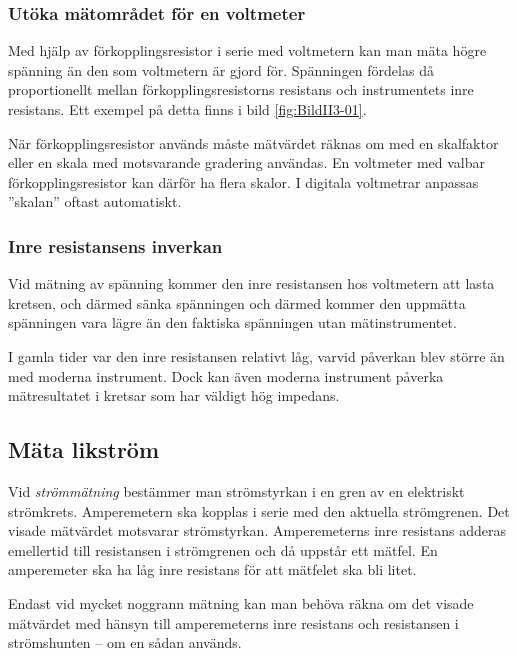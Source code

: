 \subsubsection{Utöka mätområdet för en voltmeter}

Med hjälp av förkopplingsresistor i serie med voltmetern kan man mäta
högre spänning än den som voltmetern är gjord för.
Spänningen fördelas då proportionellt mellan förkopplingsresistorns resistans
och instrumentets inre resistans.
Ett exempel på detta finns i bild \ref{fig:BildII3-01}.

När förkopplingsresistor används måste mätvärdet räknas om med en
skalfaktor eller en skala med motsvarande gradering användas.
En voltmeter med valbar förkopplingsresistor kan därför ha flera skalor.
I digitala voltmetrar anpassas ''skalan'' oftast automatiskt.

\newpage %
\subsubsection{Inre resistansens inverkan}

Vid mätning av spänning kommer den inre resistansen hos voltmetern att lasta
kretsen, och därmed sänka spänningen och därmed kommer den uppmätta spänningen
vara lägre än den faktiska spänningen utan mätinstrumentet.

I gamla tider var den inre resistansen relativt låg, varvid påverkan blev större
än med moderna instrument.
Dock kan även moderna instrument påverka mätresultatet i kretsar som har väldigt
hög impedans.

\subsection{Mäta likström}

Vid \emph{strömmätning} bestämmer man strömstyrkan i en gren av en elektriskt
strömkrets.
Amperemetern ska kopplas i serie med den aktuella strömgrenen.
Det visade mätvärdet motsvarar strömstyrkan.
Amperemeterns inre resistans adderas emellertid till resistansen i strömgrenen
och då uppstår ett mätfel.
En amperemeter ska ha låg inre resistans för att mätfelet ska bli litet.

Endast vid mycket noggrann mätning kan man behöva räkna om det visade
mätvärdet med hänsyn till amperemeterns inre resistans och resistansen
i strömshunten -- om en sådan används.

